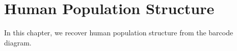 

\chapter{Human Population Structure}
\label{ch:human_population_structre}

In this chapter, we recover human population structure from the barcode diagram.

\lipsum